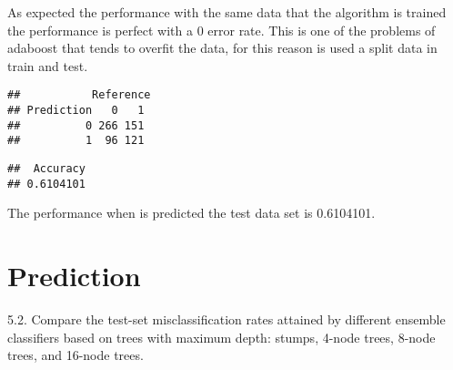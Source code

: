 \documentclass[
]{article}
\newenvironment{Shaded}{\begin{snugshade}}{\end{snugshade}}
\newcommand{\DataTypeTok}[1]{\textcolor[rgb]{0.13,0.29,0.53}{#1}}
\newcommand{\DecValTok}[1]{\textcolor[rgb]{0.00,0.00,0.81}{#1}}
\newcommand{\KeywordTok}[1]{\textcolor[rgb]{0.13,0.29,0.53}{\textbf{#1}}}
\newcommand{\NormalTok}[1]{#1}
\newcommand{\OperatorTok}[1]{\textcolor[rgb]{0.81,0.36,0.00}{\textbf{#1}}}
\newcommand{\StringTok}[1]{\textcolor[rgb]{0.31,0.60,0.02}{#1}}
\begin{document}
As expected the performance with the same data that the algorithm is
trained the performance is perfect with a 0 error rate. This is one of
the problems of adaboost that tends to overfit the data, for this reason
is used a split data in train and test.

\begin{Shaded}
\end{Shaded}

\begin{verbatim}
##           Reference
## Prediction   0   1
##          0 266 151
##          1  96 121
\end{verbatim}

\begin{verbatim}
##  Accuracy 
## 0.6104101
\end{verbatim}

The performance when is predicted the test data set is 0.6104101.

\hypertarget{prediction}{%
\section{Prediction}\label{prediction}}

5.2. Compare the test-set misclassification rates attained by different
ensemble classifiers based on trees with maximum depth: stumps, 4-node
trees, 8-node trees, and 16-node trees.
\end{document}
